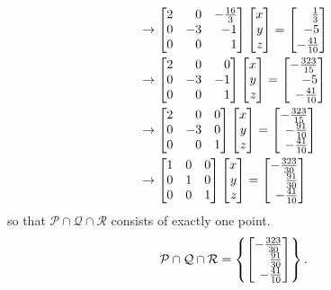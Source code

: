 \begin{exercises}
\begin{problist}
\begin{solution}
\begin{align*}
				&\rightarrow \mat{2&0&-\frac{16}{3}\\0&-3&-1\\0&0&1}\mat{x\\y\\z}=\mat{\frac{1}{3}\\-5\\-\frac{41}{10}}\\
				&\rightarrow \mat{2&0&0\\0&-3&-1\\0&0&1}\mat{x\\y\\z}=\mat{-\frac{323}{15}\\-5\\-\frac{41}{10}}\\
				&\rightarrow \mat{2&0&0\\0&-3&0\\0&0&1}\mat{x\\y\\z}=\mat{-\frac{323}{15}\\-\frac{91}{10}\\-\frac{41}{10}}\\
				&\rightarrow \mat{1&0&0\\0&1&0\\0&0&1}\mat{x\\y\\z}=\mat{-\frac{323}{30}\\ \frac{91}{30}\\-\frac{41}{10}}
			\end{align*}
			so that $\mathcal{P}\cap\mathcal{Q}\cap\mathcal{R}$ consists of exactly one point. 
			\[ \mathcal{P}\cap\mathcal{Q}\cap\mathcal{R}=\left\lbrace\mat{-\frac{323}{30}\\ \frac{91}{30}\\-\frac{41}{10}}\right\rbrace.\]
		\end{solution}	
	\end{problist}
\end{exercises}
